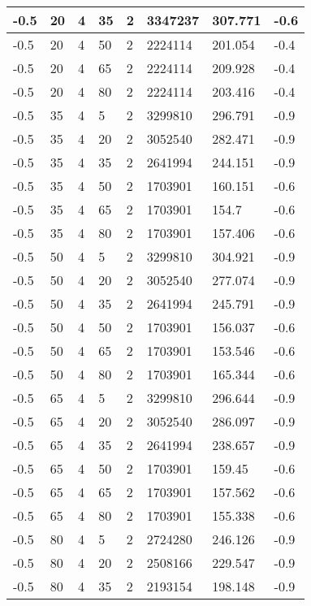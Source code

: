 \begin{longtable}{|p{1.4cm}|p{1.4cm}|p{1.4cm}|p{1.4cm}|p{1.4cm}|p{1.4cm}|p{1.4cm}|p{1.5cm}|}
        -0.5 & 20 & 4 & 35 & 2 & 3347237 & 307.771 & -0.6 \\ \hline
        -0.5 & 20 & 4 & 50 & 2 & 2224114 & 201.054 & -0.4 \\ \hline
        -0.5 & 20 & 4 & 65 & 2 & 2224114 & 209.928 & -0.4 \\ \hline
        -0.5 & 20 & 4 & 80 & 2 & 2224114 & 203.416 & -0.4 \\ \hline
        -0.5 & 35 & 4 & 5 & 2 & 3299810 & 296.791 & -0.9 \\ \hline
        -0.5 & 35 & 4 & 20 & 2 & 3052540 & 282.471 & -0.9 \\ \hline
        -0.5 & 35 & 4 & 35 & 2 & 2641994 & 244.151 & -0.9 \\ \hline
        -0.5 & 35 & 4 & 50 & 2 & 1703901 & 160.151 & -0.6 \\ \hline
        -0.5 & 35 & 4 & 65 & 2 & 1703901 & 154.7 & -0.6 \\ \hline
        -0.5 & 35 & 4 & 80 & 2 & 1703901 & 157.406 & -0.6 \\ \hline
        -0.5 & 50 & 4 & 5 & 2 & 3299810 & 304.921 & -0.9 \\ \hline
        -0.5 & 50 & 4 & 20 & 2 & 3052540 & 277.074 & -0.9 \\ \hline
        -0.5 & 50 & 4 & 35 & 2 & 2641994 & 245.791 & -0.9 \\ \hline
        -0.5 & 50 & 4 & 50 & 2 & 1703901 & 156.037 & -0.6 \\ \hline
        -0.5 & 50 & 4 & 65 & 2 & 1703901 & 153.546 & -0.6 \\ \hline
        -0.5 & 50 & 4 & 80 & 2 & 1703901 & 165.344 & -0.6 \\ \hline
        -0.5 & 65 & 4 & 5 & 2 & 3299810 & 296.644 & -0.9 \\ \hline
        -0.5 & 65 & 4 & 20 & 2 & 3052540 & 286.097 & -0.9 \\ \hline
        -0.5 & 65 & 4 & 35 & 2 & 2641994 & 238.657 & -0.9 \\ \hline
        -0.5 & 65 & 4 & 50 & 2 & 1703901 & 159.45 & -0.6 \\ \hline
        -0.5 & 65 & 4 & 65 & 2 & 1703901 & 157.562 & -0.6 \\ \hline
        -0.5 & 65 & 4 & 80 & 2 & 1703901 & 155.338 & -0.6 \\ \hline
        -0.5 & 80 & 4 & 5 & 2 & 2724280 & 246.126 & -0.9 \\ \hline
        -0.5 & 80 & 4 & 20 & 2 & 2508166 & 229.547 & -0.9 \\ \hline
        -0.5 & 80 & 4 & 35 & 2 & 2193154 & 198.148 & -0.9 \\ \hline

\end{longtable}
